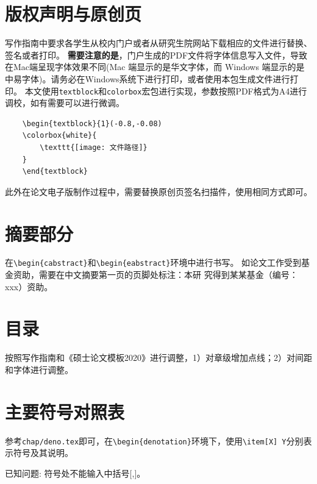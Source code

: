 \section{版权声明与原创页}
\label{sec:copy-origin}

写作指南中要求各学生从校内门户或者从研究生院网站下载相应的文件进行替换、签名或者打印。
\textbf{需要注意的是}，门户生成的PDF文件将字体信息写入文件，导致在Mac端呈现字体效果不同(Mac 端显示的是华文字体，而 Windows 端显示的是中易字体)。请务必在Windows系统下进行打印，或者使用本包生成文件进行打印。
本文使用\verb|textblock|和\verb|colorbox|宏包进行实现，参数按照PDF格式为A4进行调校，如有需要可以进行微调。

\begin{Verbatim}
    \begin{textblock}{1}(-0.8,-0.08)
    \colorbox{white}{
        \texttt{[image: 文件路径]}
    }
    \end{textblock}
\end{Verbatim}

此外在论文电子版制作过程中，需要替换原创页签名扫描件，使用相同方式即可。

\section{摘要部分}
\label{sec:abstract}

在\verb|\begin{cabstract}|和\verb|\begin{eabstract}|环境中进行书写。
如论文工作受到基金资助，需要在中文摘要第一页的页脚处标注：本研 究得到某某基金（编号：xxx）资助。

\section{目录}
\label{sec:directory}

按照写作指南和《硕士论文模板2020》进行调整，1）对章级增加点线；2）对间距和字体进行调整。

\section{主要符号对照表}
\label{sec:denotation}

参考\verb|chap/deno.tex|即可，在\verb|\begin{denotation}|环境下，使用\verb|\item[X] Y|分别表示符号及其说明。

已知问题: 符号处不能输入中括号$[$,$]$。

